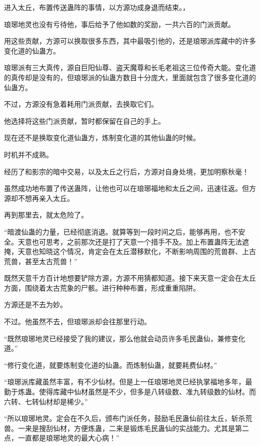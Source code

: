 
\begin{this_body}

进入太丘，布置传送蛊阵的事情，以方源功成身退而结束。，

琅琊地灵也没有亏待他，事后给予了他如数的奖励，一共六百的门派贡献。

用这些贡献，方源可以换取很多东西，其中最吸引他的，还是琅琊派库藏中的许多变化道的仙蛊方。

琅琊派有三大真传，源自巨阳仙尊、盗天魔尊和长毛老祖这三位传奇大能。变化道的真传却是没有的，但琅琊派的仙蛊方数目十分庞大，里面就包含了很多变化道的仙蛊方。

不过，方源没有急着耗用门派贡献，去换取它们。

他选择将这些门派贡献，暂时都保留在自己的手上。

现在还不是换取变化道仙蛊方，炼制变化道的其他仙蛊的时候。

时机并不成熟。

经历了和影宗的暗中交易，以及太丘之行后，方源对自身处境，更加明察秋毫！

虽然成功地布置了传送蛊阵，让他也可以在琅琊福地和太丘之间，迅速往返。但方源却不想再亲入太丘。

再到那里去，就太危险了。

“暗渡仙蛊的力量，已经彻底消退。就算等到一段时间之后，能够再用，也不安全。天意也可思考，之前那次还是打了天意一个措手不及。加上布置蛊阵无法遮掩，天意也知晓这个情况，肯定会在太丘潜移默化，不断影响周围的荒兽群、上古荒兽，甚至太古荒兽！”

既然天意千方百计地想要铲除方源，方源不用猜都知道。接下来天意一定会在太丘方面，围绕着太古荒象的尸骸。进行种种布置，形成重重陷阱。

方源还是不去为妙。

不过。他虽然不去，但琅琊派却会往那里行动。

“既然琅琊地灵已经接受了我的建议，那么他就会动员许多毛民蛊仙，兼修变化道。”

“修行变化道，就要炼制变化道的仙蛊。而炼制仙蛊，就要耗费仙材。”

“琅琊派库藏虽然丰富，有不少仙材。但是上一任琅琊地灵已经执掌福地多年，最勤于炼蛊。使得库藏中仙材虽然是不少，但多是八转级数、准九转级数的仙材。而六转、七转仙材却是稀少。”

“所以琅琊地灵。定会在不久后，颁布门派任务，鼓励毛民蛊仙前往太丘，斩杀荒兽。一来是搜刮仙材，方便炼蛊，二来是锻炼毛民蛊仙的实战能力。尤其是第二点，一直都是琅琊地灵的最大心病！”


\end{this_body}
